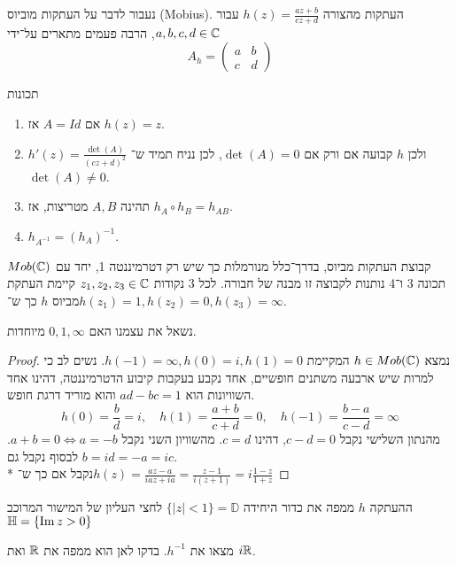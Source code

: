 נעבור לדבר על העתקות מוביוס (Mobius).
העתקות מהצורה $h(z) = \frac{a z + b}{cz + d}$ עבור $a, b, c, d \in \mathbb{C}$, הרבה פעמים מתארים על־ידי
\[
	A_h = \begin{pmatrix}
		a & b \\
		c & d
	\end{pmatrix}
\]
\begin{proposition}
	תכונות
	\begin{enumerate}
		\item אם $A = Id$ אז $h(z) = z$.
		\item $h'(z) = \frac{\det(A)}{{(cz + d)}^2}$ ולכן $h$ קבועה אם ורק אם $\det(A) = 0$, לכן נניח תמיד ש־$\det(A) \ne 0$.
		\item תהינה $A, B$ מטריצות, אז $h_A \circ h_B = h_{AB}$.
		\item $h_{A^{-1}} = {(h_A)}^{-1}$.
	\end{enumerate}
\end{proposition}
\begin{proposition}
	$Mob(\mathbb{C})$ קבוצת העתקות מביוס, בדרך־כלל מנורמלות כך שיש רק דטרמיננטה 1, יחד עם תכונה 3 ו־4 נותנות לקבוצה זו מבנה של חבורה.
	לכל 3 נקודות $z_1, z_2, z_3 \in \mathbb{C}$ קיימת העתקת מביוס $h$ כך ש־$h(z_1) = 1, h(z_2) = 0, h(z_3) = \infty$.
\end{proposition}
נשאל את עצמנו האם $0, 1, \infty$ מיוחדות.
\begin{proof}
	נמצא $h \in Mob(\mathbb{C})$ המקיימת $h(-1) = \infty, h(0) = i, h(1) = 0$.
	נשים לב כי למרות שיש ארבעה משתנים חופשיים, אחד נקבע בעקבות קיבוע הדטרמיננטה, דהינו אחד השוויונות הוא $ad - bc = 1$ והוא מוריד דרגת חופש.
	\[
		h(0) = \frac{b}{d} = i,
		\quad h(1) = \frac{a + b}{c + d} = 0,
		\quad h(-1) = \frac{b - a}{c - d} = \infty
	\]
	מהנתון השלישי נקבל $c - d = 0$, דהינו $c = d$.
	מהשוויון השני נקבל $a + b = 0 \iff a = -b$.
	לבסוף נקבל גם $b = id = -a = ic$. \\*
	נקבל אם כך ש־$h(z) = \frac{az - a}{ia z + ia} = \frac{z - 1}{i(z + 1)} = i \frac{1 - z}{1 + z}$
\end{proof}
\begin{proposition}
	ההעתקה $h$ ממפה את כדור היחידה $\{ |z| < 1 \} = \mathbb{D}$ לחצי העליון של המישור המרוכב $\mathbb{H} = \{ \operatorname{Im} z > 0 \}$
\end{proposition}
\begin{exercise}
	מצאו את $h^{-1}$. בדקו לאן הוא ממפה את $\mathbb{R}$ ואת $i\mathbb{R}$.
\end{exercise}

